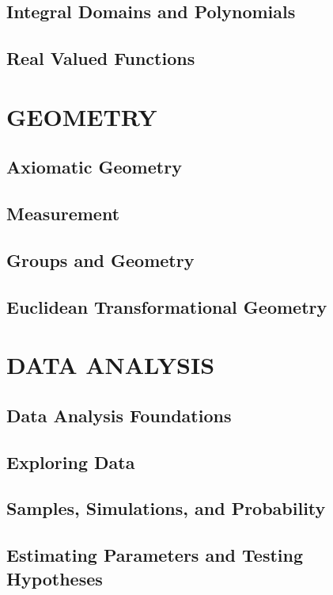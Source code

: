 \documentclass[
]{book}
\theoremstyle{definition}
\theoremstyle{definition}
\theoremstyle{definition}
\theoremstyle{remark}
\begin{document}
\hypertarget{ch:rings}{%
\chapter{Integral Domains and Polynomials}\label{ch:rings}}

\hypertarget{ch:real-valued-functions}{%
\chapter{Real Valued Functions}\label{ch:real-valued-functions}}

\hypertarget{part-geometry}{%
\part{GEOMETRY}\label{part-geometry}}

\hypertarget{ch:constructions}{%
\chapter{Axiomatic Geometry}\label{ch:constructions}}

\hypertarget{ch:measurement}{%
\chapter{Measurement}\label{ch:measurement}}

\hypertarget{ch:algebraic-geometry}{%
\chapter{Groups and Geometry}\label{ch:algebraic-geometry}}

\hypertarget{ch:transformations}{%
\chapter{Euclidean Transformational Geometry}\label{ch:transformations}}

\hypertarget{part-data-analysis}{%
\part{DATA ANALYSIS}\label{part-data-analysis}}

\hypertarget{ch:data1}{%
\chapter{Data Analysis Foundations}\label{ch:data1}}

\hypertarget{ch:data-explore}{%
\chapter{Exploring Data}\label{ch:data-explore}}

\hypertarget{ch:simulations}{%
\chapter{Samples, Simulations, and Probability}\label{ch:simulations}}

\hypertarget{ch:parameters}{%
\chapter{Estimating Parameters and Testing Hypotheses}\label{ch:parameters}}

  
\end{document}
